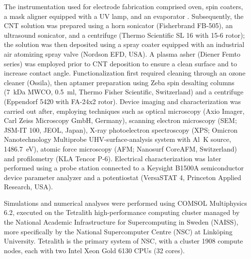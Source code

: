 The instrumentation used for electrode fabrication comprised oven, spin coaters, a mask aligner equipped with a UV lamp, and an evaporator . 
Subsequently, the CNT solution was prepared using a horn sonicator (Fisherbrand FB-505), an ultrasound sonicator, and a centrifuge (Thermo Scientific SL 16 with 15-6 rotor); the solution was then deposited using a spray coater equipped with an industrial air atomizing spray valve (Nordson EFD, USA). A plasma asher (Diener Femto series) was employed prior to CNT deposition to ensure a clean surface and to increase contact angle.
Functionalization first required cleaning through an ozone cleaner (Ossila), then aptamer preparation using Zeba spin desalting columns (\SI{7}{\kilo\dalton} MWCO, \SI{0.5}{\ml}, Thermo Fisher Scientific, Switzerland) and a centrifuge (Eppendorf 5420 with FA-24x2 rotor).
Device imaging and characterization was carried out after, employing techniques such as optical microscopy (Axio Imager, Carl Zeiss Microscopy GmbH, Germany), scanning electron microscopy (SEM; JSM-IT 100, JEOL, Japan), X-ray photoelectron spectroscopy (XPS; Omicron Nanotechnology Multiprobe UHV-surface-analysis system with Al~K\textalpha{} source, \SI{1486.7}{\electronvolt}), atomic force microscopy (AFM; Nanosurf CoreAFM, Switzerland) and profilometry (KLA Tencor P-6). Electrical characterization was later performed using a probe station connected to a Keysight B1500A semiconductor device parameter analyzer and a potentiostat (VersaSTAT 4, Princeton Applied Research, USA).

Simulations and numerical analyses were performed using COMSOL Multiphysics 6.2, executed on the Tetralith high-performance computing cluster managed by the National Academic Infrastructure for Supercomputing in Sweden (NAISS), more specifically by the National Supercomputer Centre (NSC)
at Linköping University. Tetralith is the primary system of NSC, with a cluster \num{1908} compute nodes, each with two Intel Xeon Gold 6130 CPUs (32 cores).

